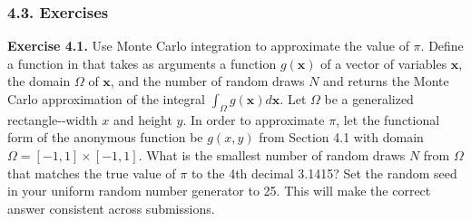 \documentclass[11pt]{article}
\begin{document}
    \subsubsection{4.3. Exercises}\label{exercises}

    \textbf{Exercise 4.1.} Use Monte Carlo integration to approximate the
value of \(\pi\). Define a function in that takes as arguments a
function \(g(\mathbf{x})\) of a vector of variables \(\mathbf{x}\), the
domain \(\Omega\) of \(\mathbf{x}\), and the number of random draws
\(N\) and returns the Monte Carlo approximation of the integral
\(\int_\Omega g(\mathbf{x}) d\mathbf{x}\). Let \(\Omega\) be a
generalized rectangle-\/-width \(x\) and height \(y\). In order to
approximate \(\pi\), let the functional form of the anonymous function
be \(g(x,y)\) from Section 4.1 with domain
\(\Omega = [-1,1]\times[-1,1]\). What is the smallest number of random
draws \(N\) from \(\Omega\) that matches the true value of \(\pi\) to
the 4th decimal 3.1415? Set the random seed in your uniform random
number generator to 25. This will make the correct answer consistent
across submissions.
\end{document}
